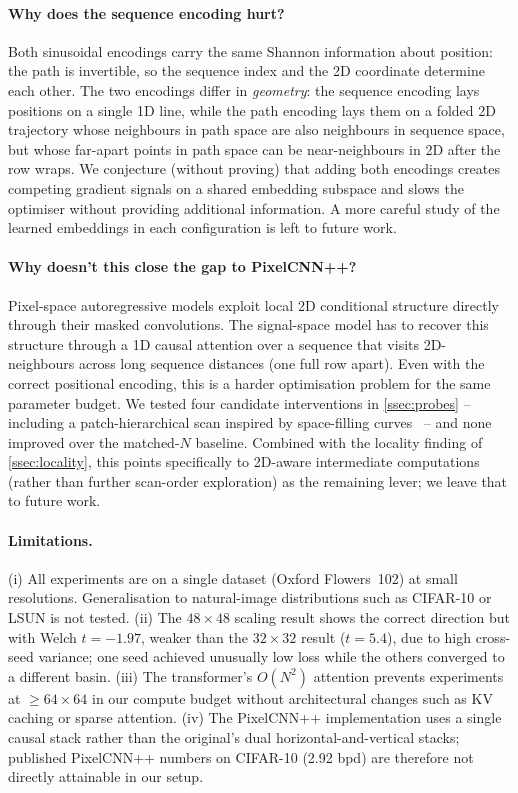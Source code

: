 \documentclass[conference]{IEEEtran}
\begin{document}
\paragraph{Why does the sequence encoding hurt?}
Both sinusoidal encodings carry the same Shannon information about
position: the path is invertible, so the sequence index and the
2D coordinate determine each other. The two encodings differ in
\emph{geometry}: the sequence encoding lays positions on a single
1D line, while the path encoding lays them on a folded 2D
trajectory whose neighbours in path space are also neighbours in
sequence space, but whose far-apart points in path space can be
near-neighbours in 2D after the row wraps. We conjecture (without
proving) that adding both encodings creates competing gradient
signals on a shared embedding subspace and slows the optimiser
without providing additional information. A more careful study of
the learned embeddings in each configuration is left to future work.

\paragraph{Why doesn't this close the gap to PixelCNN++?}
Pixel-space autoregressive models exploit local 2D conditional
structure directly through their masked convolutions. The
signal-space model has to recover this structure through a
1D causal attention over a sequence that visits 2D-neighbours
across long sequence distances (one full row apart). Even with the
correct positional encoding, this is a harder optimisation problem
for the same parameter budget. We tested four candidate interventions in \cref{ssec:probes} --
including a patch-hierarchical scan inspired by space-filling
curves~\cite{li2025direction,li2025radar} -- and none improved
over the matched-$N$ baseline. Combined with the locality finding
of \cref{ssec:locality}, this points specifically to 2D-aware
intermediate computations (rather than further scan-order
exploration) as the remaining lever; we leave that to future work.

\paragraph{Limitations.}
(i) All experiments are on a single dataset (Oxford Flowers~102) at
small resolutions. Generalisation to natural-image distributions
such as CIFAR-10 or LSUN is not tested.
(ii) The $48\times48$ scaling result shows the correct direction
but with Welch $t=-1.97$, weaker than the $32\times32$ result
($t=5.4$), due to high cross-seed variance; one seed achieved
unusually low loss while the others converged to a different basin.
(iii) The transformer's $O(N^2)$ attention prevents experiments at
$\geq 64\times 64$ in our compute budget without architectural
changes such as KV caching or sparse attention.
(iv) The PixelCNN++ implementation uses a single causal stack rather
than the original's dual horizontal-and-vertical stacks; published
PixelCNN++ numbers on CIFAR-10 (\SI{2.92}{} bpd) are therefore not
directly attainable in our setup.
\end{document}
